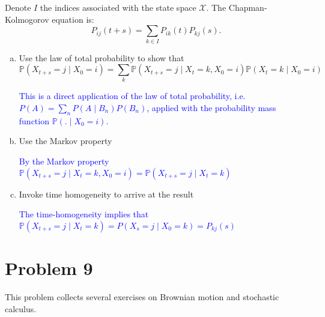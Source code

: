\documentclass[11pt]{extarticle}
\theoremstyle{plain}
\theoremstyle{definition}
\begin{document}
Denote $I$ the indices associated with the state space $\mathcal X$. The Chapman-Kolmogorov equation is: 
\begin{equation*}
	P_{ij}(t+s) = \sum_{k \in I} P_{ik}(t) P_{kj}(s).
\end{equation*}

\begin{enumerate}[(a)]
\item Use the law of total probability to show that 
\begin{equation*}
	\mathbb P(X_{t+s} = j \mid X_0 = i) = \sum_k \mathbb P(X_{t+s} = j \mid X_t = k, X_0 = i) \mathbb P(X_t = k \mid X_0 = i) 
\end{equation*}

\textcolor{blue}{This is a direct application of the law of total probability, i.e. $P(A)=\sum_n P\left(A \mid B_n\right) P\left(B_n\right)$, applied with the probability mass function $\mathbb P( . \mid X_0 = i) $.}
\item Use the Markov property

\textcolor{blue}{By the Markov property $\mathbb P(X_{t+s} = j \mid X_t = k, X_0 = i)=\mathbb P(X_{t+s} = j \mid X_t = k)$}

\item Invoke time homogeneity to arrive at the result

\textcolor{blue}{The time-homogeneity implies that $\mathbb P(X_{t+s} = j \mid X_t = k)= P(X_{s} = j \mid X_0 = k)= P_{kj}(s)$}

\end{enumerate}



\vspace{10mm}
\section*{Problem 9}

This problem collects several exercises on Brownian motion and stochastic calculus.
\end{document}
